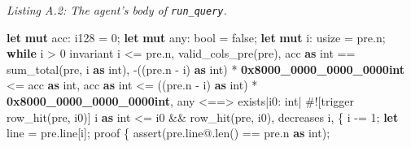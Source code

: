 \documentclass[
  10pt,
]{article}
\newenvironment{Shaded}{}{}
\newcommand{\AttributeTok}[1]{\textcolor[rgb]{0.49,0.56,0.16}{#1}}
\newcommand{\ConstantTok}[1]{\textcolor[rgb]{0.53,0.00,0.00}{#1}}
\newcommand{\ControlFlowTok}[1]{\textcolor[rgb]{0.00,0.44,0.13}{\textbf{#1}}}
\newcommand{\DataTypeTok}[1]{\textcolor[rgb]{0.56,0.13,0.00}{#1}}
\newcommand{\DecValTok}[1]{\textcolor[rgb]{0.25,0.63,0.44}{#1}}
\newcommand{\ErrorTok}[1]{\textcolor[rgb]{1.00,0.00,0.00}{\textbf{#1}}}
\newcommand{\KeywordTok}[1]{\textcolor[rgb]{0.00,0.44,0.13}{\textbf{#1}}}
\newcommand{\NormalTok}[1]{#1}
\newcommand{\OperatorTok}[1]{\textcolor[rgb]{0.40,0.40,0.40}{#1}}
\begin{document}
\emph{Listing A.2: The agent's body of \texttt{run\_query}.}

\begin{Shaded}
\begin{Highlighting}[]
    \KeywordTok{let} \KeywordTok{mut}\NormalTok{ acc}\OperatorTok{:} \DataTypeTok{i128} \OperatorTok{=} \DecValTok{0}\OperatorTok{;}
    \KeywordTok{let} \KeywordTok{mut}\NormalTok{ any}\OperatorTok{:} \DataTypeTok{bool} \OperatorTok{=} \ConstantTok{false}\OperatorTok{;}
    \KeywordTok{let} \KeywordTok{mut}\NormalTok{ i}\OperatorTok{:} \DataTypeTok{usize} \OperatorTok{=}\NormalTok{ pre}\OperatorTok{.}\NormalTok{n}\OperatorTok{;}
    \ControlFlowTok{while}\NormalTok{ i }\OperatorTok{\textgreater{}} \DecValTok{0}
\NormalTok{        invariant}
\NormalTok{            i }\OperatorTok{\textless{}=}\NormalTok{ pre}\OperatorTok{.}\NormalTok{n}\OperatorTok{,}
\NormalTok{            valid\_cols\_pre(pre)}\OperatorTok{,}
\NormalTok{            acc }\KeywordTok{as}\NormalTok{ int }\OperatorTok{==}\NormalTok{ sum\_total(pre}\OperatorTok{,}\NormalTok{ i }\KeywordTok{as}\NormalTok{ int)}\OperatorTok{,}
            \OperatorTok{{-}}\NormalTok{((pre}\OperatorTok{.}\NormalTok{n }\OperatorTok{{-}}\NormalTok{ i) }\KeywordTok{as}\NormalTok{ int) }\OperatorTok{*} \ErrorTok{0x8000\_0000\_0000\_0000int} \OperatorTok{\textless{}=}\NormalTok{ acc }\KeywordTok{as}\NormalTok{ int}\OperatorTok{,}
\NormalTok{            acc }\KeywordTok{as}\NormalTok{ int }\OperatorTok{\textless{}=}\NormalTok{ ((pre}\OperatorTok{.}\NormalTok{n }\OperatorTok{{-}}\NormalTok{ i) }\KeywordTok{as}\NormalTok{ int) }\OperatorTok{*} \ErrorTok{0x8000\_0000\_0000\_0000int}\OperatorTok{,}
\NormalTok{            any }\OperatorTok{\textless{}==\textgreater{}}\NormalTok{ exists}\OperatorTok{|}\NormalTok{i0}\OperatorTok{:}\NormalTok{ int}\OperatorTok{|} \AttributeTok{\#![}\NormalTok{trigger row\_hit}\AttributeTok{(}\NormalTok{pre}\OperatorTok{,}\NormalTok{ i0}\AttributeTok{)]}\NormalTok{ i }\KeywordTok{as}\NormalTok{ int }\OperatorTok{\textless{}=}\NormalTok{ i0 }\OperatorTok{\&\&}\NormalTok{ row\_hit(pre}\OperatorTok{,}\NormalTok{ i0)}\OperatorTok{,}
\NormalTok{        decreases i}\OperatorTok{,}
    \OperatorTok{\{}
\NormalTok{        i }\OperatorTok{{-}=} \DecValTok{1}\OperatorTok{;}
        \KeywordTok{let}\NormalTok{ line }\OperatorTok{=}\NormalTok{ pre}\OperatorTok{.}\NormalTok{line[i]}\OperatorTok{;}
\NormalTok{        proof }\OperatorTok{\{}
\NormalTok{            assert(pre}\OperatorTok{.}\NormalTok{line}\OperatorTok{@.}\NormalTok{len() }\OperatorTok{==}\NormalTok{ pre}\OperatorTok{.}\NormalTok{n }\KeywordTok{as}\NormalTok{ int)}\OperatorTok{;}

\end{Highlighting}
\end{Shaded}
\end{document}
